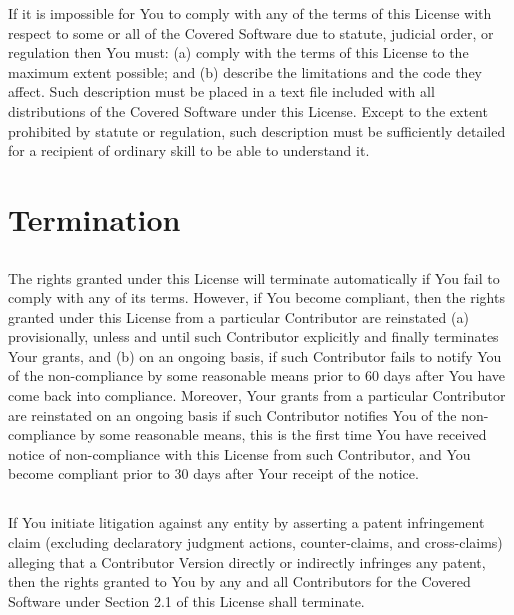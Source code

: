\documentclass[a4paper, 12pt]{article}
\begin{document}
If it is impossible for You to comply with any of the terms of this License with respect to some or all of the Covered Software due to statute, judicial order, or regulation then You must: (a) comply with the terms of this License to the maximum extent possible; and (b) describe the limitations and the code they affect. Such description must be placed in a text file included with all distributions of the Covered Software under this License. Except to the extent prohibited by statute or regulation, such description must be sufficiently detailed for a recipient of ordinary skill to be able to understand it.

\section{Termination}

\subsection{}

The rights granted under this License will terminate automatically if You fail to comply with any of its terms. However, if You become compliant, then the rights granted under this License from a particular Contributor are reinstated (a) provisionally, unless and until such Contributor explicitly and finally terminates Your grants, and (b) on an ongoing basis, if such Contributor fails to notify You of the non-compliance by some reasonable means prior to 60 days after You have come back into compliance. Moreover, Your grants from a particular Contributor are reinstated on an ongoing basis if such Contributor notifies You of the non-compliance by some reasonable means, this is the first time You have received notice of non-compliance with this License from such Contributor, and You become compliant prior to 30 days after Your receipt of the notice.

\subsection{}

If You initiate litigation against any entity by asserting a patent infringement claim (excluding declaratory judgment actions, counter-claims, and cross-claims) alleging that a Contributor Version directly or indirectly infringes any patent, then the rights granted to You by any and all Contributors for the Covered Software under Section 2.1 of this License shall terminate.
\end{document}
